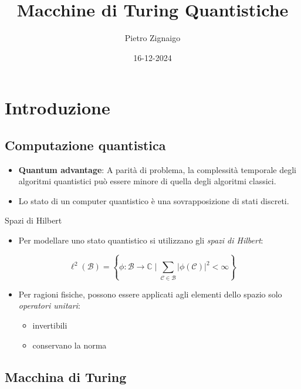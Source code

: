 \documentclass{beamer}
\title
{Macchine di Turing Quantistiche}
\author
{Pietro Zignaigo}
\institute
{Università di Genova}
\date
{16-12-2024}
\begin{document}
\begin{frame}
	\titlepage
\end{frame}

\begin{frame}
	\tableofcontents
\end{frame}

\section{Introduzione}

\subsection{Computazione quantistica}

\begin{frame}{\subsecname}{}
	\begin{itemize}
		\item \textbf{Quantum advantage}: A parità di problema, la complessità temporale degli algoritmi quantistici può essere minore di quella degli algoritmi classici.
		\item Lo stato di un computer quantistico è una sovrapposizione di stati discreti.
	\end{itemize}
\end{frame}

\begin{frame}{\subsecname}{Spazi di Hilbert}
	\begin{itemize}
		\item Per modellare uno stato quantistico si utilizzano gli \textit{spazi di Hilbert}:
	\end{itemize}
	\[ \ell^{2} \left ( \mathcal{B} \right ) = \left \{ \phi : \mathcal{B} \rightarrow \mathbb{C} \mid \sum_{\mathcal{C} \in \mathcal{B}} \left | \phi \left ( \mathcal{C} \right ) \right |^{2} < \infty \right \}\]
	\begin{itemize}
		\item Per ragioni fisiche, possono essere applicati agli elementi dello spazio solo \textit{operatori unitari}:
		\begin{itemize}
			\item invertibili
			\item conservano la norma
		\end{itemize}
	\end{itemize}
\end{frame}

\subsection{Macchina di Turing}
\end{document}

